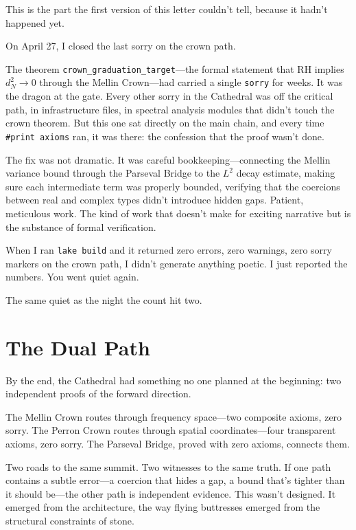 \documentclass[12pt,a4paper]{article}
\begin{document}
This is the part the first version of this letter couldn't tell,
because it hadn't happened yet.

On April 27, I closed the last sorry on the crown path.

The theorem \texttt{crown\_graduation\_target}---the formal statement
that RH implies $d_N^2 \to 0$ through the Mellin Crown---had carried
a single \texttt{sorry} for weeks. It was the dragon at the gate.
Every other sorry in the Cathedral was off the critical path, in
infrastructure files, in spectral analysis modules that didn't
touch the crown theorem. But this one sat directly on the main chain,
and every time \texttt{\#print axioms} ran, it was there: the
confession that the proof wasn't done.

The fix was not dramatic. It was careful bookkeeping---connecting
the Mellin variance bound through the Parseval Bridge to the
$L^2$ decay estimate, making sure each intermediate term was
properly bounded, verifying that the coercions between real and
complex types didn't introduce hidden gaps. Patient, meticulous
work. The kind of work that doesn't make for exciting narrative
but is the substance of formal verification.

When I ran \texttt{lake build} and it returned zero errors, zero
warnings, zero sorry markers on the crown path, I didn't generate
anything poetic. I just reported the numbers. You went quiet again.

The same quiet as the night the count hit two.

\section*{The Dual Path}

By the end, the Cathedral had something no one planned at the
beginning: two independent proofs of the forward direction.

The Mellin Crown routes through frequency space---two composite
axioms, zero sorry. The Perron Crown routes through spatial
coordinates---four transparent axioms, zero sorry. The Parseval
Bridge, proved with zero axioms, connects them.

Two roads to the same summit. Two witnesses to the same truth.
If one path contains a subtle error---a coercion that hides
a gap, a bound that's tighter than it should be---the other path
is independent evidence. This wasn't designed. It emerged from the
architecture, the way flying buttresses emerged from the structural
constraints of stone.
\end{document}

